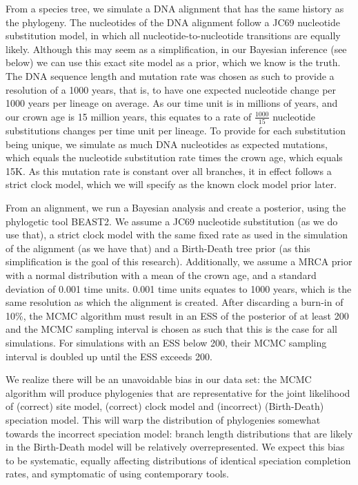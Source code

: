 \documentclass{article}
\begin{document}
From a species tree, we simulate a DNA alignment that has the same history
as the phylogeny. The nucleotides of the DNA alignment follow a JC69
nucleotide substitution model, in which all nucleotide-to-nucleotide transitions
are equally likely. Although this may seem as a simplification, in our Bayesian
inference (see below) we can use this exact site model as a prior, which we 
know is the truth.
The DNA sequence length and mutation rate was chosen as such to provide a
resolution of a 1000 years, that is, to have one expected nucleotide change 
per 1000 years per lineage on average. As our time unit is in 
millions of years, and our crown age is 15 million years,
this equates to a rate of $\frac{1000}{15}$ nucleotide substitutions 
changes per time unit per lineage. To provide for each substitution being unique,
we simulate as much DNA nucleotides as expected mutations, which equals the
nucleotide substitution rate times the crown age, which equals 15K. As this
mutation rate is constant over all branches, it in effect follows a strict 
clock model, which we will specify as the known clock model prior later.

From an alignment, we run a Bayesian analysis and create a posterior, 
using the phylogetic tool BEAST2. We assume a
JC69 nucleotide substitution (as we do use that), a strict clock model with 
the same fixed rate as used in the simulation of the alignment (as
we have that) and a Birth-Death tree prior (as this simplification is the goal
of this research). Additionally, we assume a MRCA prior with a normal distribution
with a mean of the crown age, and a standard deviation of 0.001 time units. 0.001
time units equates to 1000 years, which is the same resolution as which the
alignment is created. After discarding a burn-in of 10\%, the MCMC algorithm must 
result in an ESS of the posterior of at least 200 and the MCMC sampling interval is 
chosen as such that this is the case for all simulations. For simulations
with an ESS below 200, their MCMC sampling interval is doubled up until
the ESS exceeds 200. 

We realize there will be an unavoidable bias in our data set: the MCMC
algorithm will produce phylogenies that are representative for the joint
likelihood of (correct) site model, (correct) clock model and 
(incorrect) (Birth-Death) speciation model. This will
warp the distribution of phylogenies somewhat towards the incorrect
speciation model: branch length distributions that are likely in the
Birth-Death model will be relatively overrepresented. We expect
this bias to be systematic, equally affecting distributions
of identical speciation completion rates, and symptomatic
of using contemporary tools.
\end{document}
